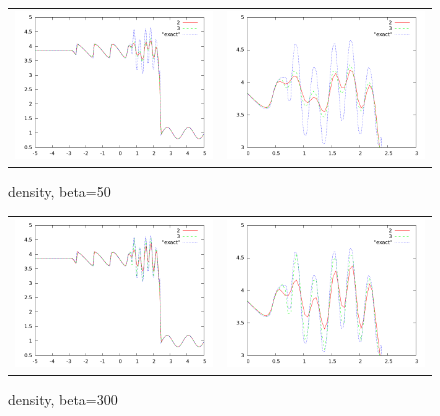 \documentclass[10pt,preprint]{aastex}
\begin{document}
\begin{figure}
  \begin{center}
	\begin{tabular}{cc}
      \includegraphics[width=.425\textwidth]{50.png} &
	  \includegraphics[width=.425\textwidth]{50zoom.png}
	\end{tabular}
  \end{center}
  \caption{density, beta=50}
  \label{fig:pvcellcomp}
\end{figure}

\begin{figure}
  \begin{center}
	\begin{tabular}{cc}
      \includegraphics[width=.425\textwidth]{300.png} &
	  \includegraphics[width=.425\textwidth]{300zoom.png}
	\end{tabular}
  \end{center}
  \caption{density, beta=300}
  \label{fig:pvcellcomp}
\end{figure}



\end{document}
